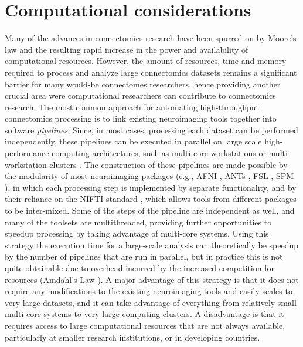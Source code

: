 \documentclass{bmcart}
\begin{document}
\section{Computational considerations}

Many of the advances in connectomics research have been spurred on by Moore's law and the resulting rapid increase in the power and availability of computational resources. However, the amount of resources, time and memory required to process and analyze large connectomics datasets remains a significant barrier for many would-be connectomes researchers, hence providing another crucial area were computational researchers can contribute to connectomics research. The most common approach for automating high-throughput connectomics processing is to link existing neuroimaging tools together into software \emph{pipelines}. Since, in most cases, processing each dataset can be performed independently, these pipelines can be executed in parallel on large scale high-performance computing architectures, such as multi-core workstations or multi-workstation clusters \cite{Dinov2010, Yan2010, Bellec2012, SLV2012, Gorgolewski2011, Craddock2013c}. The construction of these pipelines are made possible by the modularity of most neuroimaging packages (e.g., AFNI \cite{Cox1996}, ANTs \cite{Avants2008}, FSL \cite{Smith2004}, SPM \cite{Friston1994b}), in which each processing step is implemented by separate functionality, and by their reliance on the NIFTI standard \cite{Cox2004}, which allows tools from different packages to be inter-mixed. Some of the steps of the pipeline are independent as well, and many of the toolsets are multithreaded, providing further opportunities to speedup processing by taking advantage of multi-core systems. Using this strategy the execution time for a large-scale analysis can theoretically be speedup by the number of pipelines that are run in parallel, but in practice this is not quite obtainable due to overhead incurred by the increased competition for resources (Amdahl's Law \cite{Amdahl1967}). A major advantage of this strategy is that it does not require any modifications to the existing neuroimaging tools and easily scales to very large datasets, and it can take advantage of everything from relatively small multi-core systems to very large computing clusters. A disadvantage is that it requires access to large computational resources that are not always available, particularly at smaller research institutions, or in developing countries.
\end{document}
